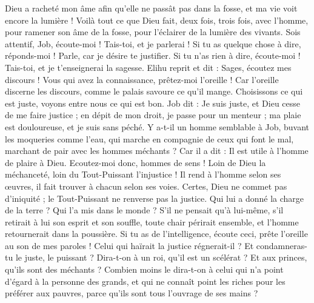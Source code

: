 \begin{multicols}{2}
Dieu a racheté mon âme afin qu'elle ne passât pas dans la fosse, et ma vie voit encore la lumière !
Voilà tout ce que Dieu fait, deux fois, trois fois, avec l'homme,
pour ramener son âme de la fosse, pour l'éclairer de la lumière des vivants.
Sois attentif, Job, écoute-moi ! Tais-toi, et je parlerai !
Si tu as quelque chose à dire, réponds-moi ! Parle, car je désire te justifier.
Si tu n'as rien à dire, écoute-moi ! Tais-toi, et je t'enseignerai la sagesse.
\VerseOne{}Elihu reprit et dit :
Sages, écoutez mes discours ! Vous qui avez la connaissance, prêtez-moi l'oreille !
Car l'oreille discerne les discours, comme le palais savoure ce qu'il mange.
Choisissons ce qui est juste, voyons entre nous ce qui est bon.
Job dit : Je suis juste, et Dieu cesse de me faire justice ;
en dépit de mon droit, je passe pour un menteur ; ma plaie est douloureuse, et je suis sans péché.
Y a-t-il un homme semblable à Job, buvant les moqueries comme l'eau,
qui marche en compagnie de ceux qui font le mal, marchant de pair avec les hommes méchants ?
Car il a dit : Il est utile à l'homme de plaire à Dieu.
Ecoutez-moi donc, hommes de sens ! Loin de Dieu la méchanceté, loin du Tout-Puissant l'injustice !
Il rend à l'homme selon ses œuvres, il fait trouver à chacun selon ses voies.
Certes, Dieu ne commet pas d'iniquité ; le Tout-Puissant ne renverse pas la justice.
Qui lui a donné la charge de la terre ? Qui l'a mis dans le monde ?
S'il ne pensait qu'à lui-même, s'il retirait à lui son esprit et son souffle,
toute chair périrait ensemble, et l'homme retournerait dans la poussière.
Si tu as de l'intelligence, écoute ceci, prête l'oreille au son de mes paroles !
Celui qui haïrait la justice régnerait-il ? Et condamneras-tu le juste, le puissant ?
Dira-t-on à un roi, qu'il est un scélérat ? Et aux princes, qu'ils sont des méchants ?
Combien moins le dira-t-on à celui qui n'a point d'égard à la personne des grands, et qui ne connaît point les riches pour les préférer aux pauvres, parce qu'ils sont tous l'ouvrage de ses mains ?

\end{multicols}
